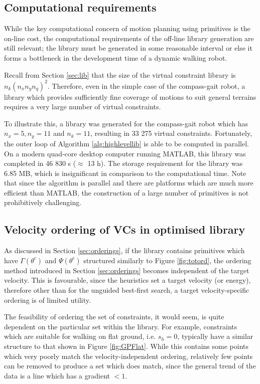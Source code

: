 \subsection{Computational requirements} \label{sec:vcgenres}
While the key computational concern of motion planning using primitives is the on-line cost, the computational requirements of the off-line library generation are still relevant; the library must be generated in some reasonable interval or else it forms a bottleneck in the development time of a dynamic walking robot.

Recall from Section \ref{sec:lib} that the size of the virtual constraint library is $n_k(n_xn_yn_q)^2$. Therefore, even in the simple case of the compass-gait robot, a library which provides sufficiently fine coverage of motions to suit general terrains requires a very large number of virtual constraints.

To illustrate this, a library was generated for the compass-gait robot which has $n_x=5,n_y=11$ and $n_k=11$, resulting in 33 275 virtual constraints. Fortunately, the outer loop of Algorithm \ref{alg:highlevellib} is able to be computed in parallel. On a modern quad-core desktop computer running MATLAB, this library was completed in 46 830 s ($\approx$ 13 h). The storage requirement for the library was 6.85 MB, which is insignificant in comparison to the computational time. Note that since the algorithm is parallel and there are platforms which are much more efficient than MATLAB, the construction of a large number of primitives is not prohibitively challenging.

\subsection{Velocity ordering of VCs in optimised library}
As discussed in Section \ref{sec:orderings}, if the library contains primitives which have $\Gamma(\theta^c)$ and $\Psi(\theta^c)$ structured similarly to Figure \ref{fig:totord}, the ordering method introduced in Section \ref{sec:orderings} becomes independent of the target velocity. This is favourable, since the heuristics set a target velocity (or energy), therefore other than for the unguided best-first search, a target velocity-specific ordering is of limited utility.

The feasibility of ordering the set of constraints, it would seem, is quite dependent on the particular set within the library. For example, constraints which are suitable for walking on flat ground, i.e. $s_h=0$, typically have a similar structure to that shown in Figure \ref{fig:GPFlat}. While this contains some points which very poorly match the velocity-independent ordering, relatively few points can be removed to produce a set which does match, since the general trend of the data is a line which has a gradient $<1$.

